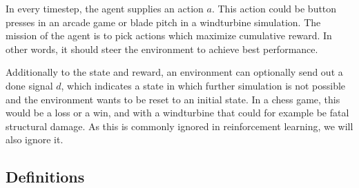 \documentclass[hyperref,german,beleg]{cgvpub}
\begin{document}
In every timestep, the agent supplies an action \(a\). This action could be button presses in an arcade game or blade pitch in a windturbine simulation. The mission of the agent is to pick actions which maximize cumulative reward. In other words, it should steer the environment to achieve best performance.

Additionally to the state and reward, an environment can optionally send out a done signal \(d\), which indicates a state in which further simulation is not possible and the environment wants to be reset to an initial state. In a chess game, this would be a loss or a win, and with a windturbine that could for example be fatal structural damage. As this is commonly ignored in reinforcement learning, we will also ignore it.

\subsection{Definitions}
\end{document}
